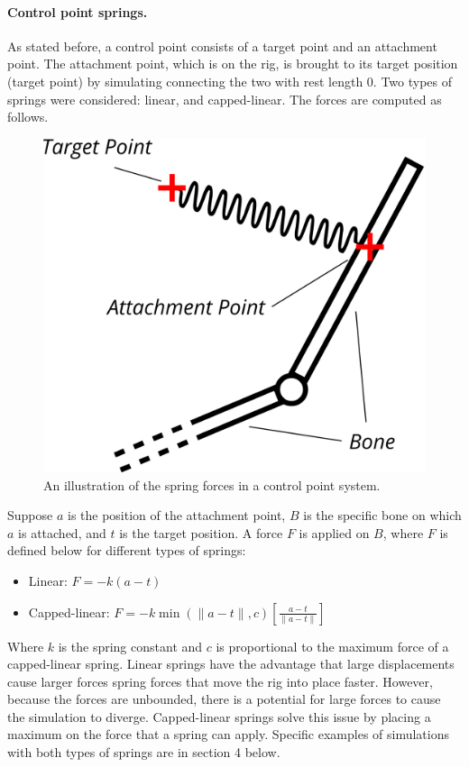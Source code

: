 \documentclass[10pt,twocolumn,letterpaper]{article}
\begin{document}
\paragraph{Control point springs.} As stated before, a control point consists of a target point and an attachment point. The attachment point, which is on the rig, is brought to its target position (target point) by simulating connecting the two with rest length 0. Two types of springs were considered: linear, and capped-linear. The forces are computed as follows.

\begin{figure}[]
    \centering
    \includegraphics[width=0.7\columnwidth] {diagram1.png}
    \caption{An illustration of the spring forces in a control point system.}
    \label{img:cp-spring}
\end{figure}

Suppose $a$ is the position of the attachment point, $B$ is the specific bone on which $a$ is attached, and $t$ is the target position. A force $F$ is applied on $B$, where $F$ is defined below for different types of springs:
\begin{itemize}
    \item Linear: $F = -k(a-t)$
    \item Capped-linear: $F = -k \min(\|a - t\|, c) \left[ \frac{a-t}{\|a - t\|} \right]$
\end{itemize}
Where $k$ is the spring constant and $c$ is proportional to the maximum force of a capped-linear spring. Linear springs have the advantage that large displacements cause larger forces spring forces that move the rig into place faster. However, because the forces are unbounded, there is a potential for large forces to cause the simulation to diverge. Capped-linear springs solve this issue by placing a maximum on the force that a spring can apply. Specific examples of simulations with both types of springs are in section 4 below.
\end{document}
